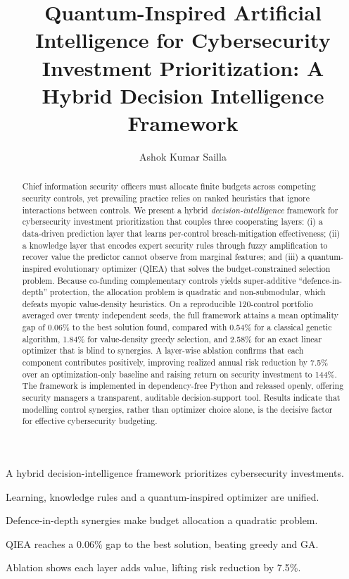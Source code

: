 \documentclass[preprint,12pt]{elsarticle}
\begin{document}
\begin{frontmatter}

\title{Quantum-Inspired Artificial Intelligence for Cybersecurity Investment
Prioritization: A Hybrid Decision Intelligence Framework}

\author[a]{Ashok Kumar Sailla}

\begin{abstract}
Chief information security officers must allocate finite budgets across competing
security controls, yet prevailing practice relies on ranked heuristics that ignore
interactions between controls. We present a hybrid \emph{decision-intelligence}
framework for cybersecurity investment prioritization that couples three cooperating
layers: (i) a data-driven prediction layer that learns per-control breach-mitigation
effectiveness; (ii) a knowledge layer that encodes expert security rules through
fuzzy amplification to recover value the predictor cannot observe from marginal
features; and (iii) a quantum-inspired evolutionary optimizer (QIEA) that solves the
budget-constrained selection problem. Because co-funding complementary controls
yields super-additive ``defence-in-depth'' protection, the allocation problem is
quadratic and non-submodular, which defeats myopic value-density heuristics. On a
reproducible 120-control portfolio averaged over twenty independent seeds, the full
framework attains a mean optimality gap of 0.06\% to the best solution found,
compared with 0.54\% for a classical genetic algorithm, 1.84\% for value-density
greedy selection, and 2.58\% for an exact linear optimizer that is blind to
synergies. A layer-wise ablation confirms that each component contributes positively,
improving realized annual risk reduction by 7.5\% over an optimization-only baseline
and raising return on security investment to 144\%. The framework is implemented in
dependency-free Python and released openly, offering security managers a transparent,
auditable decision-support tool. Results indicate that modelling control synergies,
rather than optimizer choice alone, is the decisive factor for effective cybersecurity
budgeting.
\end{abstract}

\begin{highlights}
\item A hybrid decision-intelligence framework prioritizes cybersecurity investments.
\item Learning, knowledge rules and a quantum-inspired optimizer are unified.
\item Defence-in-depth synergies make budget allocation a quadratic problem.
\item QIEA reaches a 0.06\% gap to the best solution, beating greedy and GA.
\item Ablation shows each layer adds value, lifting risk reduction by 7.5\%.
\end{highlights}


\end{frontmatter}
\end{document}
